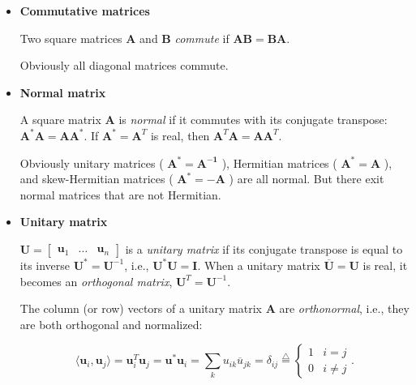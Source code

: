 \documentclass[10pt,b5paper,titlepage]{book}
\newcommand*\eqd{\stackrel{\triangle}{=}}
\begin{document}
\begin{itemize}
    \item \textbf{Commutative matrices}

        Two square matrices $\mathbf{A}$ and $\mathbf{B}$ \textit{commute}
        if $\mathbf{A}\mathbf{B} = \mathbf{B}\mathbf{A}$.

        Obviously all diagonal matrices commute.

    \item \textbf{Normal matrix}

        A square matrix $\mathbf{A}$ is \textit{normal} if it commutes with its
        conjugate transpose: $\mathbf{A}^{*}\mathbf{A} = \mathbf{A}\mathbf{A}^{*}$.
        If $\mathbf{A}^{*} = \mathbf{A}^{T}$ is real, then
        $\mathbf{A}^{T}\mathbf{A} = \mathbf{A}\mathbf{A}^{T}$.

        Obviously unitary matrices ( $\mathbf{A^{*} = \mathbf{A}^{-1}}$ ),
        Hermitian matrices ( $\mathbf{A}^{*} = \mathbf{A}$ ), and skew-Hermitian
        matrices ( $\mathbf{A}^{*} = -\mathbf{A}$ ) are all normal. But there exit
        normal matrices that are not Hermitian.

    \item \textbf{Unitary matrix}

        $\mathbf{U} = \begin{bmatrix} \mathbf{u}_1 & \ldots & \mathbf{u}_n \end{bmatrix}$ is a
        \textit{unitary matrix} if its conjugate transpose is equal to its inverse
        $\mathbf{U}^{*} = \mathbf{U}^{-1}$, i.e., $\mathbf{U}^{*}\mathbf{U} = \mathbf{I}$.
        When a unitary matrix $\overline{\mathbf{U}} = \mathbf{U}$ is real, it
        becomes an \textit{orthogonal matrix}, $\mathbf{U}^{T} = \mathbf{U}^{-1}$.

        The column (or row) vectors of a unitary matrix $\mathbf{A}$ are
        \textit{orthonormal}, i.e., they are both orthogonal and normalized:

        \begin{equation}
            \langle \mathbf{u}_{i}, \mathbf{u}_{j} \rangle
            = \mathbf{u}_{i}^{T}\mathbf{u}_{j}
            = \mathbf{u}^{*}\mathbf{u}_{i}
            = \sum_{k} u_{ik} \overline{u}_{jk}
            = \delta_{ij}
            \eqd \left\{
                \begin{array}{lr}
                    1 & i = j\\
                    0 & i \neq j
                \end{array}
            \right.
        .\end{equation}


\end{itemize}
\end{document}
